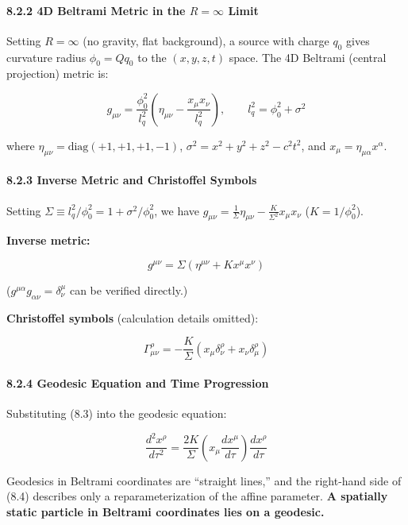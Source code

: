 \documentclass[a4paper,11pt]{article}
\theoremstyle{definition}
\begin{document}
\paragraph{\texorpdfstring{8.2.2 4D Beltrami Metric in the \(R = \infty\) Limit}{8.2.2 4D Beltrami Metric in the R = \textbackslash infty Limit}}\label{d-beltrami-metric-in-the-r-infty-limit}

Setting \(R = \infty\) (no gravity, flat background), a source with charge \(q_0\) gives curvature radius \(\phi_0 = Qq_0\) to the \((x,y,z,t)\) space. The 4D Beltrami (central projection) metric is:

\[g_{\mu\nu} = \frac{\phi_0^2}{l_q^2}\left(\eta_{\mu\nu} - \frac{x_\mu x_\nu}{l_q^2}\right), \qquad l_q^2 = \phi_0^2 + \sigma^2 \tag{8.1}\]

where \(\eta_{\mu\nu} = \text{diag}(+1,+1,+1,-1)\), \(\sigma^2 = x^2+y^2+z^2-c^2t^2\), and \(x_\mu = \eta_{\mu\alpha}x^\alpha\).

\paragraph{8.2.3 Inverse Metric and Christoffel Symbols}\label{inverse-metric-and-christoffel-symbols}

Setting \(\Sigma \equiv l_q^2/\phi_0^2 = 1 + \sigma^2/\phi_0^2\), we have \(g_{\mu\nu} = \frac{1}{\Sigma}\eta_{\mu\nu} - \frac{K}{\Sigma^2}x_\mu x_\nu\) (\(K = 1/\phi_0^2\)).

\textbf{Inverse metric:}

\[g^{\mu\nu} = \Sigma(\eta^{\mu\nu} + Kx^\mu x^\nu) \tag{8.2}\]

(\(g^{\mu\alpha}g_{\alpha\nu} = \delta^\mu_\nu\) can be verified directly.)

\textbf{Christoffel symbols} (calculation details omitted):

\[\Gamma^\rho_{\mu\nu} = -\frac{K}{\Sigma}(x_\mu \delta^\rho_\nu + x_\nu \delta^\rho_\mu) \tag{8.3}\]

\paragraph{8.2.4 Geodesic Equation and Time Progression}\label{geodesic-equation-and-time-progression}

Substituting (8.3) into the geodesic equation:

\[\frac{d^2 x^\rho}{d\tau^2} = \frac{2K}{\Sigma}\left(x_\mu \frac{dx^\mu}{d\tau}\right)\frac{dx^\rho}{d\tau} \tag{8.4}\]

Geodesics in Beltrami coordinates are ``straight lines,'' and the right-hand side of (8.4) describes only a reparameterization of the affine parameter. \textbf{A spatially static particle in Beltrami coordinates lies on a geodesic.}
\end{document}

